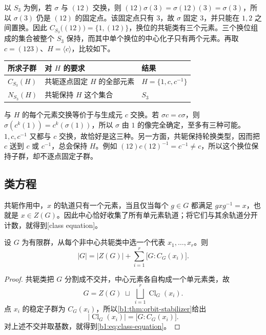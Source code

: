 \ProseParagraphBreak
以 \(S_3\) 为例，若 \(\sigma\) 与 \((12)\) 交换，则 \((12)\sigma(3)=\sigma(12)(3)=\sigma(3)\)，所以 \(\sigma(3)\) 仍是 \((12)\) 的固定点。该固定点只有 \(3\)，故 \(\sigma\) 固定 \(3\)，并只能在 \(1,2\) 之间置换。因此 \(C_{S_3}\bigl((12)\bigr)=\bigl\{1,(12)\bigr\}\)，换位的共轭类有三个元素。三个换位组成的集合被整个 \(S_3\) 保持，而其中单个换位的中心化子只有两个元素。再取 \(c=(123)\)、\(H=\langle c\rangle\)，比较如下。
\begin{center}
	\begin{tabularx}{\linewidth}{@{}lXl@{}}
		\toprule
		所求子群 & 对 \(H\) 的要求 & 结果 \\
		\midrule
		\(C_{S_3}(H)\) & 共轭逐点固定 \(H\) 的全部元素 & \(H=\{1,c,c^{-1}\}\) \\
		\(N_{S_3}(H)\) & 共轭保持 \(H\) 这个集合 & \(S_3\) \\
		\bottomrule
	\end{tabularx}
\end{center}
与 \(H\) 的每个元素交换等价于与生成元 \(c\) 交换。若 \(\sigma c=c\sigma\)，则 \(\sigma(c^k(1))=c^k(\sigma(1))\)，所以 \(\sigma\) 由 \(1\) 的像完全确定，至多有三种可能。\(1,c,c^{-1}\) 又都与 \(c\) 交换，故恰好是这三种。另一方面，共轭保持轮换类型，因而把 \(c\) 送到 \(c\) 或 \(c^{-1}\)，总会保持 \(H\)。例如 \((12)c(12)^{-1}=c^{-1}\ne c\)，所以这个换位保持子群，却不逐点固定子群。

\subsection{类方程}
\label{b1:subsec:0402:02}

共轭作用中，\(x\) 的轨道只有一个元素，当且仅当每个 \(g\in G\) 都满足 \(gxg^{-1}=x\)，也就是 \(x\in Z(G)\)。因此中心恰好收集了所有单元素轨道；将它们与其余轨道分开计数，就得到[class equation]。

\begin{proposition}[类方程]\label{b1:prop:class-equation}
	设 \(G\) 为有限群，从每个非中心共轭类中选一个代表 \(x_1,\ldots,x_r\)。则
	\begin{equation}\label{b1:eq:class-equation}
		|G|=\bigl|Z(G)\bigr|+\sum_{i=1}^{r}\bigl[G:C_G(x_i)\bigr].
	\end{equation}
\end{proposition}
\begin{proof}
	共轭类把 \(G\) 分割成不交并，中心元素各自构成一个单元素类，故
	\[
		G=Z(G)\;\sqcup\;\bigsqcup_{i=1}^r\operatorname{Cl}_G(x_i).
	\]
	点 \(x_i\) 的稳定子群为 \(C_G(x_i)\)，所以\cref{b1:thm:orbit-stabilizer}给出
	\[
		\bigl|\operatorname{Cl}_G(x_i)\bigr|=\bigl[G:C_G(x_i)\bigr].
	\]
	对上述不交并取基数，就得到\eqref{b1:eq:class-equation}。
\end{proof}


